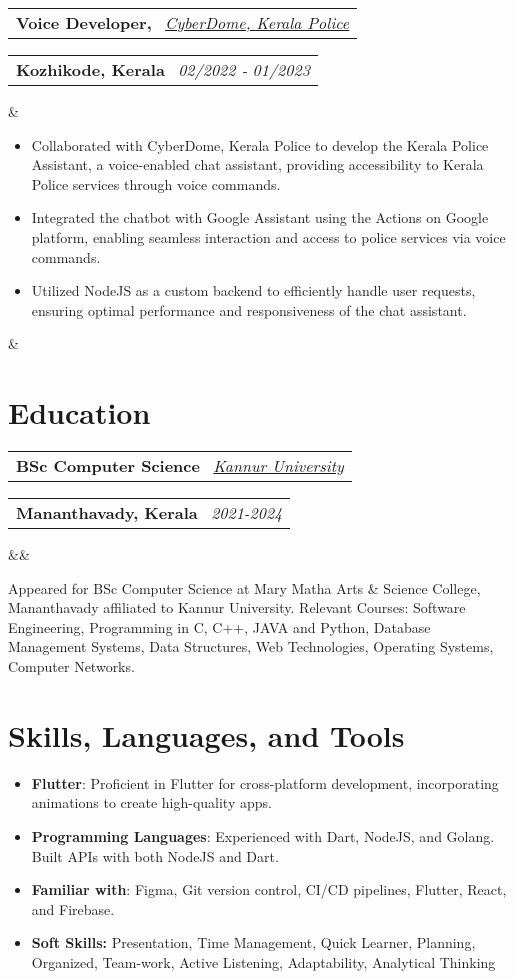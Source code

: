 \documentclass[11pt,a4paper,sans]{moderncv}
\makeatletter
\newcommand*{\customcventry}[7][.13em]{
\begin{tabular}{@{}l}
{\bfseries #4} \
{\itshape #3}
\end{tabular}
\hfill
\begin{tabular}{l@{}}
{\bfseries #5} \
{\itshape #2}
\end{tabular}
\ifx&#7&%
\else{\
\begin{minipage}{\maincolumnwidth}%
\small#7%
\end{minipage}}\fi%
\par\addvspace{#1}}
\makeatother
\begin{document}
\customcventry{02/2022 ‐ 01/2023}{{\color{blue}\href{https://cyberdome.kerala.gov.in/}{CyberDome, Kerala Police}}}{Voice Developer,}{Kozhikode, Kerala}{}{
    {\begin{itemize}[leftmargin=0.6cm, label={\textbullet}]
                \item Collaborated with CyberDome, Kerala Police to develop the Kerala Police Assistant, a voice-enabled chat assistant, providing accessibility to Kerala Police services through voice commands.
                \item Integrated the chatbot with Google Assistant using the Actions on Google platform, enabling seamless interaction and access to police services via voice commands.
                \item Utilized NodeJS as a custom backend to efficiently handle user requests, ensuring optimal performance and responsiveness of the chat assistant.
            \end{itemize}}}

\section{Education}
\customcventry{2021-2024}{\color{blue}\href{https://kannuruniversity.ac.in/}{Kannur University}}{BSc Computer Science}{Mananthavady, Kerala}{}{}
{Appeared for BSc Computer Science at Mary Matha Arts \& Science College, Mananthavady affiliated to Kannur University. Relevant Courses: Software Engineering, Programming in C, C++, JAVA and Python, Database Management Systems, Data Structures, Web Technologies, Operating Systems, Computer Networks.}

\clearpage

\section{Skills, Languages, and Tools}
 {\begin{itemize}[label=\textbullet]
      \item {\textbf{Flutter}}: Proficient in Flutter for cross-platform development, incorporating animations to create high-quality apps.
      \item {\textbf{Programming Languages}}: Experienced with Dart, NodeJS, and Golang. Built APIs with both NodeJS and Dart.
      \item {\textbf{Familiar with}}: Figma, Git version control, CI/CD pipelines, Flutter, React, and Firebase.
      \item {\textbf{Soft Skills:} Presentation, Time Management, Quick Learner, Planning, Organized, Team-work, Active Listening, Adaptability, Analytical Thinking}
  \end{itemize}}
\end{document}
